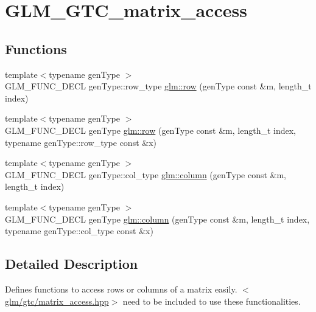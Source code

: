 \hypertarget{group__gtc__matrix__access}{\section{G\-L\-M\-\_\-\-G\-T\-C\-\_\-matrix\-\_\-access}
\label{group__gtc__matrix__access}
}
\subsection*{Functions}
\begin{DoxyCompactItemize}
\item 
{\footnotesize template$<$typename gen\-Type $>$ }\\G\-L\-M\-\_\-\-F\-U\-N\-C\-\_\-\-D\-E\-C\-L gen\-Type\-::row\-\_\-type \hyperlink{group__gtc__matrix__access_ga259e5ebd0f31ec3f83440f8cae7f5dba}{glm\-::row} (gen\-Type const \&m, length\-\_\-t index)
\item 
{\footnotesize template$<$typename gen\-Type $>$ }\\G\-L\-M\-\_\-\-F\-U\-N\-C\-\_\-\-D\-E\-C\-L gen\-Type \hyperlink{group__gtc__matrix__access_gaadcc64829aadf4103477679e48c7594f}{glm\-::row} (gen\-Type const \&m, length\-\_\-t index, typename gen\-Type\-::row\-\_\-type const \&x)
\item 
{\footnotesize template$<$typename gen\-Type $>$ }\\G\-L\-M\-\_\-\-F\-U\-N\-C\-\_\-\-D\-E\-C\-L gen\-Type\-::col\-\_\-type \hyperlink{group__gtc__matrix__access_ga96022eb0d3fae39d89fc7a954e59b374}{glm\-::column} (gen\-Type const \&m, length\-\_\-t index)
\item 
{\footnotesize template$<$typename gen\-Type $>$ }\\G\-L\-M\-\_\-\-F\-U\-N\-C\-\_\-\-D\-E\-C\-L gen\-Type \hyperlink{group__gtc__matrix__access_ga9e757377523890e8b80c5843dbe4dd15}{glm\-::column} (gen\-Type const \&m, length\-\_\-t index, typename gen\-Type\-::col\-\_\-type const \&x)
\end{DoxyCompactItemize}


\subsection{Detailed Description}
Defines functions to access rows or columns of a matrix easily. $<$\hyperlink{matrix__access_8hpp}{glm/gtc/matrix\-\_\-access.\-hpp}$>$ need to be included to use these functionalities. 

